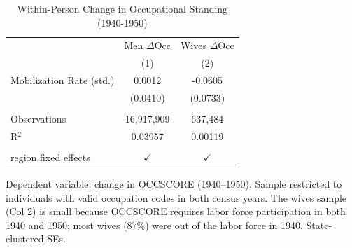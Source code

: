 
\begin{table}[htbp]
   \caption{\label{tab:occupation} Within-Person Change in Occupational Standing (1940-1950)}
   \bigskip
   \centering
   \begin{tabular}{lcc}
      \toprule
                               & Men $\Delta$Occ  & Wives $\Delta$Occ \\    
                               & (1)              & (2)\\  
      \midrule 
      Mobilization Rate (std.) & 0.0012           & -0.0605\\   
                               & (0.0410)         & (0.0733)\\   
       \\
      Observations             & 16,917,909       & 637,484\\  
      R$^2$                    & 0.03957          & 0.00119\\  
       \\
      region fixed effects     & $\checkmark$     & $\checkmark$\\
      \bottomrule
   \end{tabular}

   \par \raggedright \footnotesize
   Dependent variable: change in OCCSCORE (1940--1950). Sample restricted to individuals with valid occupation codes in both census years. The wives sample (Col 2) is small because OCCSCORE requires labor force participation in both 1940 and 1950; most wives (87\%) were out of the labor force in 1940. State-clustered SEs.
\end{table}


